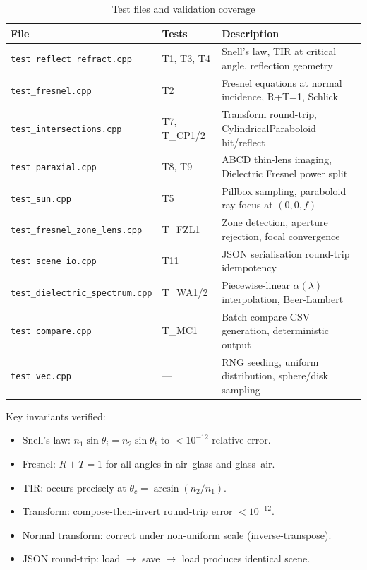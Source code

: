 \documentclass[12pt,a4paper]{report}
\begin{document}
\begin{table}[H]\centering
\caption{Test files and validation coverage}
\begin{tabular}{lll}
\toprule
File & Tests & Description \\
\midrule
\texttt{test\_reflect\_refract.cpp} & T1, T3, T4  & Snell's law, TIR at critical angle, reflection geometry \\
\texttt{test\_fresnel.cpp}          & T2          & Fresnel equations at normal incidence, R+T=1, Schlick \\
\texttt{test\_intersections.cpp}    & T7, T\_CP1/2 & Transform round-trip, CylindricalParaboloid hit/reflect \\
\texttt{test\_paraxial.cpp}         & T8, T9      & ABCD thin-lens imaging, Dielectric Fresnel power split \\
\texttt{test\_sun.cpp}              & T5          & Pillbox sampling, paraboloid ray focus at $(0,0,f)$ \\
\texttt{test\_fresnel\_zone\_lens.cpp} & T\_FZL1  & Zone detection, aperture rejection, focal convergence \\
\texttt{test\_scene\_io.cpp}        & T11         & JSON serialisation round-trip idempotency \\
\texttt{test\_dielectric\_spectrum.cpp} & T\_WA1/2 & Piecewise-linear $\alpha(\lambda)$ interpolation, Beer-Lambert \\
\texttt{test\_compare.cpp}          & T\_MC1      & Batch compare CSV generation, deterministic output \\
\texttt{test\_vec.cpp}              & —           & RNG seeding, uniform distribution, sphere/disk sampling \\
\bottomrule
\end{tabular}
\end{table}

Key invariants verified:
\begin{itemize}
  \item Snell's law: $n_1\sin\theta_i = n_2\sin\theta_t$ to $<10^{-12}$ relative error.
  \item Fresnel: $R + T = 1$ for all angles in air--glass and glass--air.
  \item TIR: occurs precisely at $\theta_c = \arcsin(n_2/n_1)$.
  \item Transform: compose-then-invert round-trip error $<10^{-12}$.
  \item Normal transform: correct under non-uniform scale (inverse-transpose).
  \item JSON round-trip: load $\to$ save $\to$ load produces identical scene.
\end{itemize}
\end{document}
